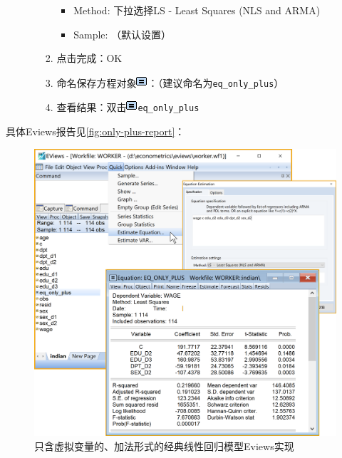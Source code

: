 \documentclass[12pt,(landscape,a4paper),(portrait,a4paper)]{article}
\providecommand{\tightlist}{%
  \setlength{\itemsep}{0pt}\setlength{\parskip}{0pt}}
\theoremstyle{definition}
\theoremstyle{definition}
\theoremstyle{definition}
\theoremstyle{remark}
\begin{document}
\begin{itemize}
\begin{enumerate}
\begin{enumerate}
      \begin{itemize}
      \tightlist
      \item
        Method: 下拉选择LS - Least Squares (NLS and ARMA)
      \item
        Sample: （默认设置）
      \end{itemize}
    \item
      点击完成：OK
    \item
      命名保存方程对象\includegraphics{picture/object/Equation.png}：（建议命名为\texttt{eq\_only\_plus}）
    \item
      查看结果：双击\includegraphics{picture/object/Equation.png}\texttt{eq\_only\_plus}
    \end{enumerate}
  \end{enumerate}
\end{itemize}

具体Eviews报告见\ref{fig:only-plus-report}：

\begin{figure}

{\centering \includegraphics[width=27.43in]{picture/lab8-dummy-model/2-only-plus} 

}

\caption{只含虚拟变量的、加法形式的经典线性回归模型Eviews实现}\label{fig:only-plus}
\end{figure}
\end{document}
